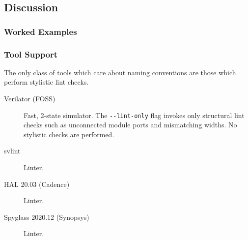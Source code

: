 \documentclass[a4paper]{article}
\begin{document}

\subsection{Discussion} %
\label{sec:HungarianNotation_discussion}

\subsubsection{Worked Examples} %
\label{sec:HungarianNotation_workedExamples}


\subsubsection{Tool Support} %
\label{sec:HungarianNotation_toolSupport}
The only class of tools which care about naming conventions are those which
perform stylistic lint checks.

\begin{description}
\item[Verilator (\gls{FOSS})]
  Fast, 2-state simulator.
  The \texttt{{-}{-}lint-only} flag invokes only structural lint checks such as
  unconnected module ports and mismatching widths.
  No stylistic checks are performed.
\item[svlint]
  Linter.
\item[HAL 20.03 (Cadence)]
  Linter.
\item[Spyglass 2020.12 (Synopsys)]
  Linter.
\end{description}
\end{document}
